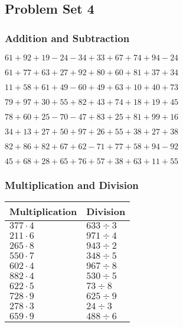 \hypertarget{problem-set-4}{%
\subsection{Problem Set 4}\label{problem-set-4}}

\hypertarget{addition-and-subtraction}{%
\subsubsection{Addition and
Subtraction}\label{addition-and-subtraction}}

\(61+92+19-24-34+33+67+74+94-24\)

\(61+77+63+27+92+80+60+81+37+34\)

\(11+58+61+49-60+49+63+10+40+73\)

\(79+97+30+55+82+43+74+18+19+45\)

\(78+60+25-70-47+83+25+81+99+16\)

\(34+13+27+50+97+26+55+38+27+38\)

\(82+86+82+67+62-71+77+58+94-92\)

\(45+68+28+65+76+57+38+63+11+55\)

\hypertarget{multiplication-and-division}{%
\subsubsection{Multiplication and
Division}\label{multiplication-and-division}}

\begin{longtable}[]{@{}ll@{}}
\toprule
Multiplication & Division\tabularnewline
\midrule
\endhead
\(377\cdot4\) & \(633÷3\)\tabularnewline
\(211\cdot6\) & \(971÷4\)\tabularnewline
\(265\cdot8\) & \(943÷2\)\tabularnewline
\(550\cdot7\) & \(348÷5\)\tabularnewline
\(602\cdot4\) & \(967÷8\)\tabularnewline
\(882\cdot4\) & \(530÷5\)\tabularnewline
\(622\cdot5\) & \(73÷8\)\tabularnewline
\(728\cdot9\) & \(625÷9\)\tabularnewline
\(278\cdot3\) & \(24÷3\)\tabularnewline
\(659\cdot9\) & \(488÷6\)\tabularnewline
\bottomrule
\end{longtable}
